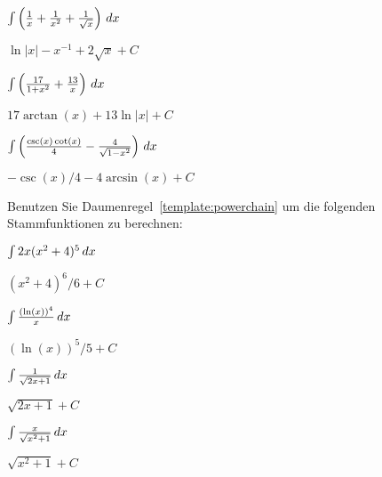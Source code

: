 \begin{exercises}
\begin{multicols}{2}
\begin{exercise}
$\int\left(\frac{1}{x} + \frac{1}{x^2} + \frac{1}{\sqrt{x}}\right)\, d x$
\begin{answer}
$\ln|x|  - x^{-1} + 2\sqrt{x} +C$ 
\end{answer}
\end{exercise}

\begin{exercise}
$\int\left(\frac{17}{1 + x^2} +\frac{13}{x}\right)\, d x$
\begin{answer}
$17\arctan(x) + 13\ln|x| +C$
\end{answer}
\end{exercise}

\begin{exercise}
$\int\left(\frac{\csc(x)\cot(x)}{4} - \frac{4}{\sqrt{1-x^2}}\right)\, d x$
\begin{answer}
$-\csc(x)/4 - 4\arcsin(x) + C$
\end{answer}
\end{exercise}

\end{multicols}



\noindent Benutzen Sie Daumenregel~\ref{template:powerchain} um die folgenden Stammfunktionen zu berechnen:
\begin{multicols}{2}
\begin{exercise}
$\int 2x (x^2+4)^5 \, d x$
\begin{answer}
$(x^2+4)^6/6 + C$
\end{answer}
\end{exercise}

\begin{exercise}
$\int \frac{(\ln(x))^4}{x} \, d x$ 
\begin{answer}
$(\ln(x))^5/5 +C$
\end{answer}
\end{exercise}


\begin{exercise}
$\int \frac{1}{\sqrt{2x +1}} \, d x$ 
\begin{answer}
$\sqrt{2x+1} + C$
\end{answer}
\end{exercise}

\columnbreak

\begin{exercise}
$\int \frac{x}{\sqrt{x^2+1}} \, d x$
\begin{answer}
$\sqrt{x^2+1} + C$
\end{answer}
\end{exercise}


\end{multicols}
\end{exercises}

